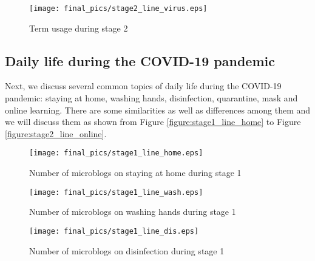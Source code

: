 \documentclass[sigconf, nonacm=true]{acmart}
\begin{document}
\begin{figure}[t!]
  \texttt{[image: final\_pics/stage2\_line\_virus.eps]}
  \vspace{-0.3cm}
  \caption{Term usage during stage 2}
  \vspace{-0.3cm}
  \label{figure:stage2_line_virus.eps}
\end{figure}


\subsection{Daily life during the COVID-19 pandemic}
Next, we discuss several common topics of daily life during the COVID-19 pandemic: staying at home, washing hands, disinfection, quarantine, mask and online learning.
There are some similarities as well as differences among them and we will discuss them as shown from Figure \ref{figure:stage1_line_home} to Figure \ref{figure:stage2_line_online}.
\begin{figure*}[htbp]
\begin{minipage}[t]{0.3\linewidth}
\centering
\texttt{[image: final\_pics/stage1\_line\_home.eps]}
  \vspace{-0.1cm}
  \caption{Number of microblogs on staying at home during stage 1}
    \vspace{-0.2cm}
  \label{figure:stage1_line_home}
\end{minipage}
\begin{minipage}[t]{0.3\linewidth}
\centering
 \texttt{[image: final\_pics/stage1\_line\_wash.eps]}
   \vspace{-0.1cm}
  \caption{Number of microblogs on washing hands during stage 1}
    \vspace{-0.2cm}
  \label{figure:stage1_line_wash}
\end{minipage}
\begin{minipage}[t]{0.3\linewidth}
\centering
\texttt{[image: final\_pics/stage1\_line\_dis.eps]}
  \vspace{-0.1cm}
  \caption{Number of microblogs on disinfection during stage 1}
    \vspace{-0.2cm}
  \label{figure:stage1_line_dis}
\end{minipage}%
\end{figure*}
\end{document}
